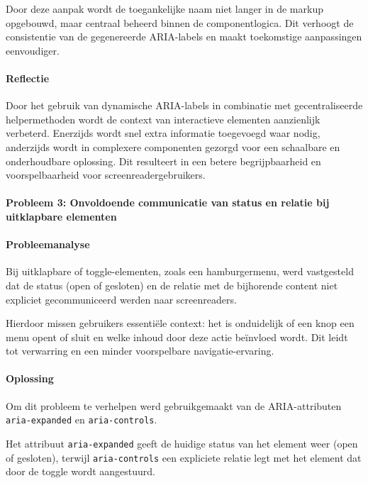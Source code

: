 Door deze aanpak wordt de toegankelijke naam niet langer in de markup opgebouwd, maar centraal beheerd binnen de componentlogica. Dit verhoogt de consistentie van de gegenereerde ARIA-labels en maakt toekomstige aanpassingen eenvoudiger.

\paragraph{Reflectie}

Door het gebruik van dynamische ARIA-labels in combinatie met gecentraliseerde helpermethoden wordt de context van interactieve elementen aanzienlijk verbeterd. Enerzijds wordt snel extra informatie toegevoegd waar nodig, anderzijds wordt in complexere componenten gezorgd voor een schaalbare en onderhoudbare oplossing. Dit resulteert in een betere begrijpbaarheid en voorspelbaarheid voor screenreadergebruikers.

\paragraph{Probleem 3: Onvoldoende communicatie van status en relatie bij uitklapbare elementen}

\paragraph{Probleemanalyse}

Bij uitklapbare of toggle-elementen, zoals een hamburgermenu, werd vastgesteld dat de status (open of gesloten) en de relatie met de bijhorende content niet expliciet gecommuniceerd werden naar screenreaders. 

Hierdoor missen gebruikers essentiële context: het is onduidelijk of een knop een menu opent of sluit en welke inhoud door deze actie beïnvloed wordt. Dit leidt tot verwarring en een minder voorspelbare navigatie-ervaring.

\paragraph{Oplossing}

Om dit probleem te verhelpen werd gebruikgemaakt van de ARIA-attributen \texttt{aria-expanded} en \texttt{aria-controls}. 

Het attribuut \texttt{aria-expanded} geeft de huidige status van het element weer (open of gesloten), terwijl \texttt{aria-controls} een expliciete relatie legt met het element dat door de toggle wordt aangestuurd. 

